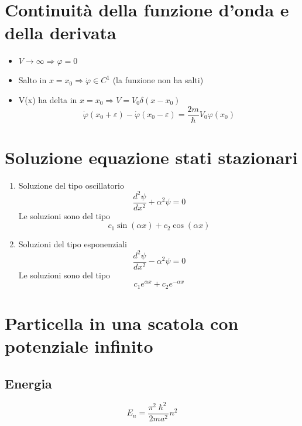 \section{Continuità della funzione d'onda e della derivata}

\begin{itemize}
    \item $V \to \infty \Rightarrow \varphi = 0$
    \item Salto in $x = x_0 \Rightarrow \dot{\varphi} \in C^1$ (la funzione non ha salti)
    \item V(x) ha delta in $x = x_0 \Rightarrow V = V_0 \delta(x-x_0)$
    \begin{equation*}
        \dot{\varphi}(x_0 + \varepsilon) - \dot{\varphi}(x_0 - \varepsilon) = \frac{2m}{\hslash}V_0 \varphi(x_0)
    \end{equation*}
\end{itemize}

\section{Soluzione equazione stati stazionari}

\begin{enumerate}
    \item Soluzione del tipo oscillatorio
    \begin{equation*}
        \frac{d^2 \psi}{dx^2} + \alpha^2\psi = 0
    \end{equation*}
    Le soluzioni sono del tipo
    \begin{equation*}
        c_1\sin(\alpha x) + c_2\cos(\alpha x)
    \end{equation*}
    \item Soluzioni del tipo esponenziali
    \begin{equation*}
        \frac{d^2 \psi}{dx^2} - \alpha^2\psi = 0
    \end{equation*}
    Le soluzioni sono del tipo
    \begin{equation*}
        c_1 e^{\alpha x} + c_2 e^{-\alpha x}
    \end{equation*}
\end{enumerate}

\section{Particella in una scatola con potenziale infinito}
\subsection{Energia}
\begin{equation*}
    E_n = \frac{\pi^2\hslash^2}{2ma^2}n^2
\end{equation*}
